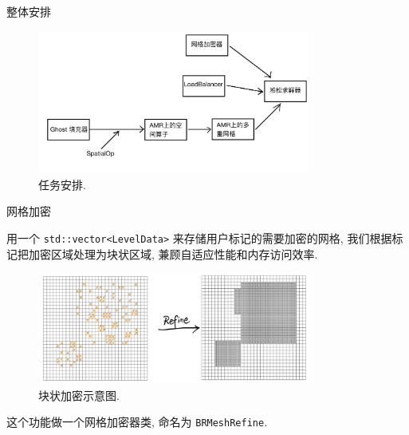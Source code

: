 \documentclass[10pt]{beamer}
\begin{document}
\begin{frame}[fragile]{整体安排}
    \footnotesize

    \begin{figure}[H]
        \centering
        \includegraphics[width=0.8\textwidth]{jpg/plan.jpeg}
        \caption{\footnotesize 任务安排.}
    \end{figure}
\end{frame}

\begin{frame}[fragile]{网格加密}
    \footnotesize

    用一个 \verb|std::vector<LevelData>| 来存储用户标记的需要加密的网格,
    我们根据标记把加密区域处理为块状区域, 兼顾自适应性能和内存访问效率.

    \begin{figure}[H]
        \centering
        \includegraphics[width=0.8\textwidth]{jpg/refine.jpeg}
        \caption{\footnotesize 块状加密示意图.}
    \end{figure}

    这个功能做一个网格加密器类, 命名为 \verb|BRMeshRefine|.
\end{frame}
\end{document}
